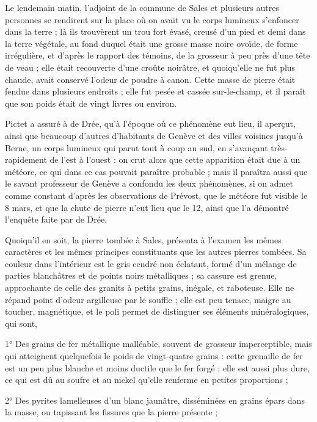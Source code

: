 \documentclass[a4paper, 12pt, oneside, french]{article}
\begin{document}
Le lendemain matin, l'adjoint de la commune de Sales et plusieurs autres personnes se rendirent sur la place où on avait vu le corps lumineux s'enfoncer dans la terre ; là ils trouvèrent un trou fort évasé, creusé d'un pied et demi dans la terre végétale, au fond duquel était une grosse masse noire ovoïde, de forme irrégulière, et d'après le rapport des témoins, de la grosseur à peu près d'une tête de veau ; elle était recouverte d'une croûte noirâtre, et quoiqu'elle ne fut plus chaude, avait conservé l'odeur de poudre à canon. Cette masse de pierre était fendue dans plusieurs endroits ; elle fut pesée et cassée sur-le-champ, et il paraît que son poids était de vingt livres ou environ.

Pictet a assuré à de Drée, qu'à l'époque où ce phénomène eut lieu, il aperçut, ainsi que beaucoup d'autres d'habitants de Genève et des villes voisines jusqu'à Berne, un corps lumineux qui parut tout à coup au sud, en s'avançant très-rapidement de l'est à l'ouest : on crut alors que cette apparition était due à un météore, ce qui dans ce cas pouvait paraître probable ; mais il paraîtra aussi que le savant professeur de Genève a confondu les deux phénomènes, si on admet comme constant d'après les observations de Prévost, que le météore fut visible le 8 mars, et que la chute de pierre n'eut lieu que le 12, ainsi que l'a démontré l'enquête faite par de Drée.

Quoiqu'il en soit, la pierre tombée à Sales, présenta à l'examen les mêmes caractères et les mêmes principes constituants que les autres pierres tombées. Sa couleur dans l'intérieur est le gris cendré non éclatant, formé d'un mélange de parties blanchâtres et de points noirs métalliques ; sa cassure est grenue, approchante de celle des granits à petits grains, inégale, et raboteuse. Elle ne répand point d'odeur argilleuse par le souffle ; elle est peu tenace, maigre au toucher, magnétique, et le poli permet de distinguer ses éléments minéralogiques, qui sont,

1° Des grains de fer métallique malléable, souvent de grosseur imperceptible, mais qui atteignent quelquefois le poids de vingt-quatre grains : cette grenaille de fer est un peu plus blanche et moins ductile que le fer forgé ; elle est aussi plus dure, ce qui est dû au soufre et au nickel qu'elle renferme en petites proportions ;

2° Des pyrites lamelleuses d'un blanc jaunâtre, disséminées en grains épars dans la masse, ou tapissant les fissures que la pierre présente ;
\end{document}
